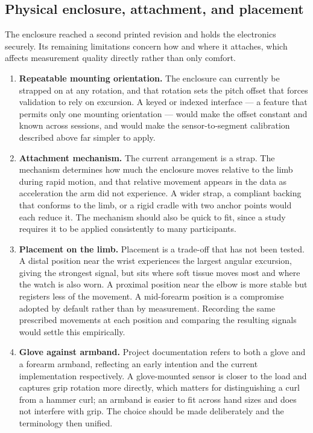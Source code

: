 \documentclass[11pt,a4paper]{article}
\begin{document}
\subsection{Physical enclosure, attachment, and placement}

The enclosure reached a second printed revision and holds the electronics
securely. Its remaining limitations concern how and where it attaches, which
affects measurement quality directly rather than only comfort.

\begin{enumerate}
\item \textbf{Repeatable mounting orientation.} The enclosure can currently be
strapped on at any rotation, and that rotation sets the pitch offset that forces
validation to rely on excursion. A keyed or indexed interface --- a feature that
permits only one mounting orientation --- would make the offset constant and
known across sessions, and would make the sensor-to-segment calibration described
above far simpler to apply.

\item \textbf{Attachment mechanism.} The current arrangement is a strap. The
mechanism determines how much the enclosure moves relative to the limb during
rapid motion, and that relative movement appears in the data as acceleration the
arm did not experience. A wider strap, a compliant backing that conforms to the
limb, or a rigid cradle with two anchor points would each reduce it. The
mechanism should also be quick to fit, since a study requires it to be applied
consistently to many participants.

\item \textbf{Placement on the limb.} Placement is a trade-off that has not been
tested. A distal position near the wrist experiences the largest angular
excursion, giving the strongest signal, but sits where soft tissue moves most and
where the watch is also worn. A proximal position near the elbow is more stable
but registers less of the movement. A mid-forearm position is a compromise
adopted by default rather than by measurement. Recording the same prescribed
movements at each position and comparing the resulting signals would settle this
empirically.

\item \textbf{Glove against armband.} Project documentation refers to both a
glove and a forearm armband, reflecting an early intention and the current
implementation respectively. A glove-mounted sensor is closer to the load and
captures grip rotation more directly, which matters for distinguishing a curl
from a hammer curl; an armband is easier to fit across hand sizes and does not
interfere with grip. The choice should be made deliberately and the terminology
then unified.


\end{enumerate}
\end{document}
